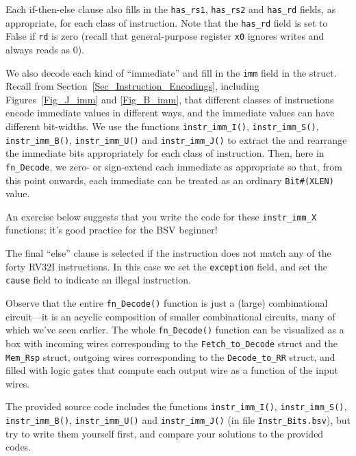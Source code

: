 Each if-then-else clause also fills in the \verb|has_rs1|,
\verb|has_rs2| and \verb|has_rd| fields, as appropriate, for each
class of instruction.  Note that the \verb|has_rd| field is set to
False if \verb|rd| is zero (recall that general-purpose register
\verb|x0| ignores writes and always reads as 0).

We also decode each kind of ``immediate'' and fill in the \verb|imm|
field in the struct.  Recall from
Section~\ref{Sec_Instruction_Encodings}, including
Figures~\ref{Fig_J_imm} and \ref{Fig_B_imm}, that different classes of
instructions encode immediate values in different ways, and the
immediate values can have different bit-widths.  We use the functions
\verb|instr_imm_I()|, \verb|instr_imm_S()|, \verb|instr_imm_B()|,
\verb|instr_imm_U()| and \verb|instr_imm_J()| to extract the and
rearrange the immediate bits appropriately for each class of
instruction.  Then, here in \verb|fn_Decode|, we zero- or sign-extend
each immediate as appropriate so that, from this point onwards, each
immediate can be treated as an ordinary \verb|Bit#(XLEN)| value.

An exercise below suggests that you write the code for these
\verb|instr_imm_X| functions; it's good practice for the BSV beginner!

The final ``else'' clause is selected if the instruction does not
match any of the forty RV32I instructions.  In this case we set the
\verb|exception| field, and set the \verb|cause| field to indicate an
illegal instruction.

Observe that the entire \verb|fn_Decode()| function is just a (large)
combinational circuit---it is an acyclic composition of smaller
combinational circuits, many of which we've seen earlier.  The whole
\verb|fn_Decode()| function can be visualized as a box with incoming
wires corresponding to the \verb|Fetch_to_Decode| struct and the
\verb|Mem_Rsp| struct, outgoing wires corresponding to the
\verb|Decode_to_RR| struct, and filled with logic gates that compute
each output wire as a function of the input wires.


\hdivider

\Exercise

The provided source code includes the functions \verb|instr_imm_I()|,
\verb|instr_imm_S()|, \verb|instr_imm_B()|, \verb|instr_imm_U()| and
\verb|instr_imm_J()| (in file \verb|Instr_Bits.bsv|), but try to write
them yourself first, and compare your solutions to the provided codes.

